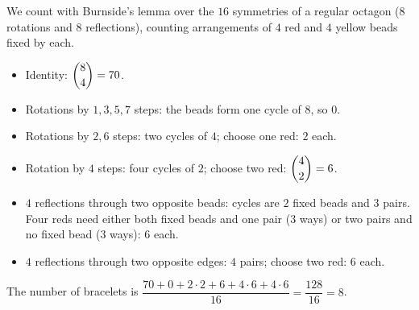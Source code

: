 We count with Burnside's lemma over the $16$ symmetries of a regular octagon (8 rotations and 8 reflections), counting arrangements of $4$ red and $4$ yellow beads fixed by each.
\begin{itemize}
\item Identity: $\dbinom84=70$.
\item Rotations by $1,3,5,7$ steps: the beads form one cycle of $8$, so $0$.
\item Rotations by $2,6$ steps: two cycles of $4$; choose one red: $2$ each.
\item Rotation by $4$ steps: four cycles of $2$; choose two red: $\dbinom42=6$.
\item $4$ reflections through two opposite beads: cycles are $2$ fixed beads and $3$ pairs. Four reds need either both fixed beads and one pair ($3$ ways) or two pairs and no fixed bead ($3$ ways): $6$ each.
\item $4$ reflections through two opposite edges: $4$ pairs; choose two red: $6$ each.
\end{itemize}
The number of bracelets is $\dfrac{70+0+2\cdot2+6+4\cdot6+4\cdot6}{16}=\dfrac{128}{16}=\boxed{8}$.
